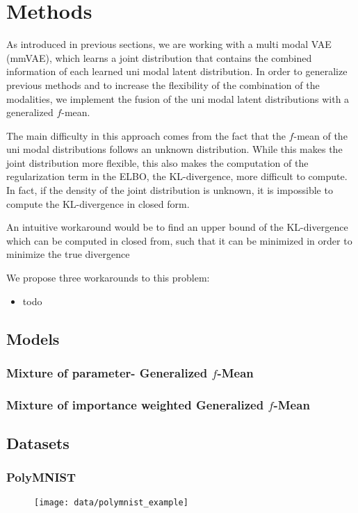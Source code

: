 \section{Methods}
As introduced in previous sections, we are working with a multi modal VAE (mmVAE), which learns a joint distribution that contains the combined information of each learned uni modal latent distribution.
In order to generalize previous methods and to increase the flexibility of the combination of the modalities, we implement the fusion of the uni modal latent distributions with a generalized $f$-mean.

The main difficulty in this approach comes from the fact that the $f$-mean of the uni modal distributions follows an unknown distribution.
While this makes the joint distribution more flexible, this also makes the computation of the regularization term in the ELBO, the KL-divergence, more difficult to compute.
In fact, if the density of the joint distribution is unknown, it is impossible to compute the KL-divergence in closed form.

An intuitive workaround would be to find an upper bound of the KL-divergence which can be computed in closed from, such that it can be minimized in order to minimize the true divergence

We propose three workarounds to this problem:
\begin{itemize}
    \item todo
\end{itemize}

\subsection{Models}

\subsubsection{Mixture of parameter- Generalized $f$-Mean}

\subsubsection{Mixture of importance weighted Generalized $f$-Mean}

\subsection{Datasets}

\subsubsection{PolyMNIST} \label{polymnist}
\begin{figure}
    \centering
    \texttt{[image: data/polymnist\_example]}
\end{figure}